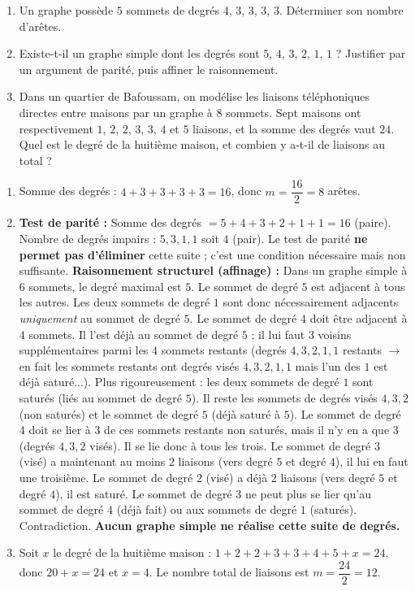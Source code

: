\documentclass[11pt]{article}
\begin{document}
\begin{exercice}
\begin{enumerate}
\item Un graphe possède $5$ sommets de degrés $4$, $3$, $3$, $3$, $3$. Déterminer son nombre d'arêtes.
\item Existe-t-il un graphe simple dont les degrés sont $5$, $4$, $3$, $2$, $1$, $1$ ? Justifier par un argument de parité, puis affiner le raisonnement.
\item Dans un quartier de Bafoussam, on modélise les liaisons téléphoniques directes entre maisons par un graphe à $8$ sommets. Sept maisons ont respectivement $1$, $2$, $2$, $3$, $3$, $4$ et $5$ liaisons, et la somme des degrés vaut $24$. Quel est le degré de la huitième maison, et combien y a-t-il de liaisons au total ?
\end{enumerate}
\end{exercice}

\begin{corrige}[Exercice]
\begin{enumerate}
\item Somme des degrés : $4+3+3+3+3 = 16$, donc $m = \dfrac{16}{2} = 8$ arêtes.
\item \textbf{Test de parité :} Somme des degrés $= 5+4+3+2+1+1 = 16$ (paire). Nombre de degrés impairs : $5, 3, 1, 1$ soit $4$ (pair). Le test de parité \textbf{ne permet pas d'éliminer} cette suite ; c'est une condition nécessaire mais non suffisante.
\textbf{Raisonnement structurel (affinage) :} Dans un graphe simple à $6$ sommets, le degré maximal est $5$. Le sommet de degré $5$ est adjacent à tous les autres. Les deux sommets de degré $1$ sont donc nécessairement adjacents \emph{uniquement} au sommet de degré $5$. Le sommet de degré $4$ doit être adjacent à $4$ sommets. Il l'est déjà au sommet de degré $5$ ; il lui faut $3$ voisins supplémentaires parmi les $4$ sommets restants (degrés $4, 3, 2, 1, 1$ restants $\to$ en fait les sommets restants ont degrés visés $4, 3, 2, 1, 1$ mais l'un des $1$ est déjà saturé...). Plus rigoureusement : les deux sommets de degré $1$ sont saturés (liés au sommet de degré $5$). Il reste les sommets de degrés visés $4, 3, 2$ (non saturés) et le sommet de degré $5$ (déjà saturé à $5$). Le sommet de degré $4$ doit se lier à $3$ de ces sommets restants non saturés, mais il n'y en a que $3$ (degrés $4, 3, 2$ visés). Il se lie donc à tous les trois. Le sommet de degré $3$ (visé) a maintenant au moins $2$ liaisons (vers degré $5$ et degré $4$), il lui en faut une troisième. Le sommet de degré $2$ (visé) a déjà $2$ liaisons (vers degré $5$ et degré $4$), il est saturé. Le sommet de degré $3$ ne peut plus se lier qu'au sommet de degré $4$ (déjà fait) ou aux sommets de degré $1$ (saturés). Contradiction. \textbf{Aucun graphe simple ne réalise cette suite de degrés.}
\item Soit $x$ le degré de la huitième maison : $1+2+2+3+3+4+5+x = 24$, donc $20 + x = 24$ et $x = 4$. Le nombre total de liaisons est $m = \dfrac{24}{2} = 12$.
\end{enumerate}
\end{corrige}
\end{document}
